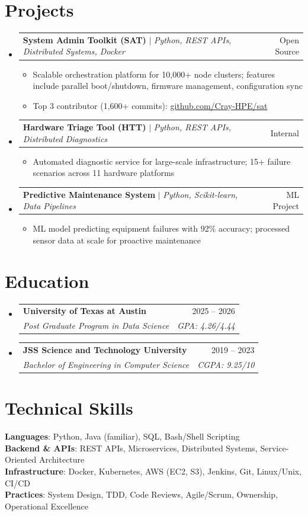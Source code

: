 \documentclass[letterpaper,10.5pt]{article}
\makeatletter
\newcommand{\resumeItem}[1]{\item\small{#1 \vspace{-3pt}}}
\newcommand{\resumeSubheading}[4]{
  \vspace{-3pt}\item
    \begin{tabular*}{0.97\textwidth}[t]{l@{\extracolsep{\fill}}r}
      \textbf{#1} & #2 \\
      \textit{\small#3} & \textit{\small #4} \\
    \end{tabular*}\vspace{-8pt}
}
\newcommand{\resumeProjectHeading}[2]{
    \item
    \begin{tabular*}{0.97\textwidth}{l@{\extracolsep{\fill}}r}
      \small#1 & #2 \\
    \end{tabular*}\vspace{-8pt}
}
\newcommand{\resumeSubHeadingListStart}{\begin{itemize}[leftmargin=0.15in, label={}]}
\newcommand{\resumeSubHeadingListEnd}{\end{itemize}}
\newcommand{\resumeItemListStart}{\begin{itemize}[leftmargin=0.15in]}
\newcommand{\resumeItemListEnd}{\end{itemize}\vspace{-6pt}}
\makeatother
\begin{document}
\section{Projects}
    \resumeSubHeadingListStart
      \resumeProjectHeading
          {\textbf{System Admin Toolkit (SAT)} $|$ \emph{Python, REST APIs, Distributed Systems, Docker}}{Open Source}
          \resumeItemListStart
            \resumeItem{Scalable orchestration platform for 10,000+ node clusters; features include parallel boot/shutdown, firmware management, configuration sync}
            \resumeItem{Top 3 contributor (1,600+ commits): \href{https://github.com/Cray-HPE/sat}{github.com/Cray-HPE/sat}}
          \resumeItemListEnd
      \resumeProjectHeading
          {\textbf{Hardware Triage Tool (HTT)} $|$ \emph{Python, REST APIs, Distributed Diagnostics}}{Internal}
          \resumeItemListStart
            \resumeItem{Automated diagnostic service for large-scale infrastructure; 15+ failure scenarios across 11 hardware platforms}
          \resumeItemListEnd
      \resumeProjectHeading
          {\textbf{Predictive Maintenance System} $|$ \emph{Python, Scikit-learn, Data Pipelines}}{ML Project}
          \resumeItemListStart
            \resumeItem{ML model predicting equipment failures with 92\% accuracy; processed sensor data at scale for proactive maintenance}
          \resumeItemListEnd
    \resumeSubHeadingListEnd

\section{Education}
  \resumeSubHeadingListStart
    \resumeSubheading
      {University of Texas at Austin}{2025 -- 2026}
      {Post Graduate Program in Data Science}{GPA: 4.26/4.44}
    \resumeSubheading
      {JSS Science and Technology University}{2019 -- 2023}
      {Bachelor of Engineering in Computer Science}{CGPA: 9.25/10}
  \resumeSubHeadingListEnd

\section{Technical Skills}
 \begin{itemize}[leftmargin=0.15in, label={}]
    \small{\item{
     \textbf{Languages}{: Python, Java (familiar), SQL, Bash/Shell Scripting} \\
     \textbf{Backend \& APIs}{: REST APIs, Microservices, Distributed Systems, Service-Oriented Architecture} \\
     \textbf{Infrastructure}{: Docker, Kubernetes, AWS (EC2, S3), Jenkins, Git, Linux/Unix, CI/CD} \\
     \textbf{Practices}{: System Design, TDD, Code Reviews, Agile/Scrum, Ownership, Operational Excellence}
    }}
 \end{itemize}
\end{document}
